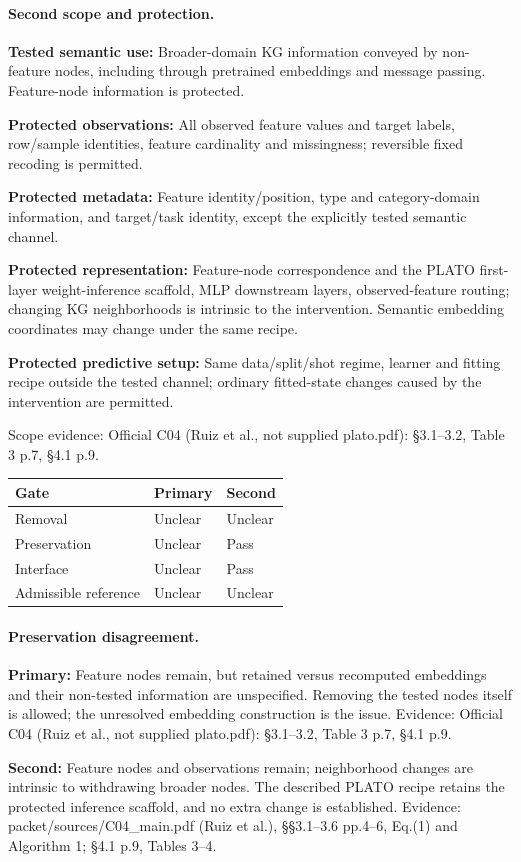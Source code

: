 \documentclass[10pt]{article}
\begin{document}
\paragraph{Second scope and protection.}
\textbf{Tested semantic use:} Broader-domain KG information conveyed by non-feature nodes, including through pretrained embeddings and message passing. Feature-node information is protected.\par
\textbf{Protected observations:} All observed feature values and target labels, row/sample identities, feature cardinality and missingness; reversible fixed recoding is permitted.\par
\textbf{Protected metadata:} Feature identity/position, type and category-domain information, and target/task identity, except the explicitly tested semantic channel.\par
\textbf{Protected representation:} Feature-node correspondence and the PLATO first-layer weight-inference scaffold, MLP downstream layers, observed-feature routing; changing KG neighborhoods is intrinsic to the intervention. Semantic embedding coordinates may change under the same recipe.\par
\textbf{Protected predictive setup:} Same data/split/shot regime, learner and fitting recipe outside the tested channel; ordinary fitted-state changes caused by the intervention are permitted.\par
Scope evidence: Official C04 (Ruiz et al., not supplied plato.pdf): §3.1--3.2, Table 3 p.7, §4.1 p.9.\par
\begin{tabular}{lll}\toprule Gate & Primary & Second \\ \midrule
Removal & Unclear & Unclear \\
Preservation & Unclear & Pass \\
Interface & Unclear & Pass \\
Admissible reference & Unclear & Unclear \\
\bottomrule\end{tabular}
\paragraph{Preservation disagreement.}
\textbf{Primary:} Feature nodes remain, but retained versus recomputed embeddings and their non-tested information are unspecified. Removing the tested nodes itself is allowed; the unresolved embedding construction is the issue. Evidence: Official C04 (Ruiz et al., not supplied plato.pdf): §3.1--3.2, Table 3 p.7, §4.1 p.9.\par
\textbf{Second:} Feature nodes and observations remain; neighborhood changes are intrinsic to withdrawing broader nodes. The described PLATO recipe retains the protected inference scaffold, and no extra change is established. Evidence: packet/sources/C04\_main.pdf (Ruiz et al.), §§3.1--3.6 pp.4--6, Eq.(1) and Algorithm 1; §4.1 p.9, Tables 3--4.\par
\end{document}
